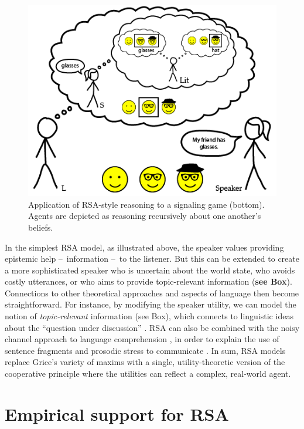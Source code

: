 \documentclass[]{elsarticle}
\begin{document}
\begin{figure}[t]
\begin{center}
\includegraphics[width=1.0\textwidth]{images/media/image02.png}
\caption{\label{fig:hg} Application of RSA-style reasoning to a signaling
game (bottom). Agents are depicted as reasoning recursively about one
another's beliefs.}
\end{center}
\end{figure}

In the simplest RSA model, as illustrated above, the speaker values
providing epistemic help --~information --~to the listener. But this can
be extended to create a more sophisticated speaker who is uncertain
about the world state, who avoids costly utterances, or who aims to
provide topic-relevant information (\textbf{see Box}). Connections to
other theoretical approaches and aspects of language then become
straightforward. For instance, by modifying the speaker utility, we can
model the notion of \emph{topic-relevant} information (see Box), which
connects to linguistic ideas about the ``question under discussion''
\cite{roberts}. RSA can also be combined with the noisy
channel approach to language comprehension \cite{levy2008},
in order to explain the use of sentence fragments and prosodic stress to
communicate \cite{bergen2016}. In sum, RSA models
replace Grice's variety of maxims with a single, utility-theoretic
version of the cooperative principle where the utilities can reflect a
complex, real-world agent.

\section{Empirical support for RSA}\label{empirical-support-for-rsa}
\end{document}
